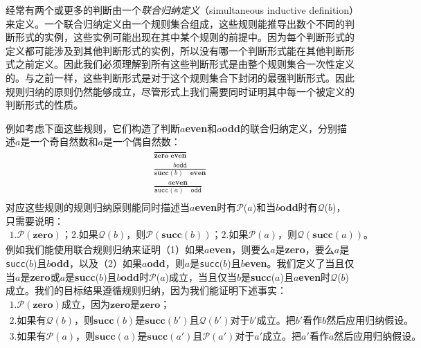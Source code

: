 经常有两个或更多的判断由一个\textit{联合归纳定义}（simultaneous inductive definition）来定义。一个联合归纳定义由一个规则集合组成，这些规则能推导出数个不同的判断形式的实例，这些实例可能出现在其中某个规则的前提中。因为每个判断形式的定义都可能涉及到其他判断形式的实例，所以没有哪一个判断形式能在其他判断形式之前定义。因此我们必须理解到所有这些判断形式是由整个规则集合一次性定义的。与之前一样，这些判断形式是对于这个规则集合下封闭的最强判断形式。因此规则归纳的原则仍然能够成立，尽管形式上我们需要同时证明其中每一个被定义的判断形式的性质。

例如考虑下面这些规则，它们构造了判断$a$\textbf{even}和$a$\textbf{odd}的联合归纳定义，分别描述$a$是一个奇自然数和$a$是一个偶自然数：
\begin{align*}
\frac{}{\textbf{zero even}} \\
\frac{b\texttt{odd}}{\textbf{succ}(b)\quad\textbf{even}} \\
\frac{a\textbf{even}}{\texttt{succ}(a)\quad\texttt{odd}} \\
\end{align*}
对应这些规则的规则归纳原则能同时描述当$a$\textbf{even}时有$\mathcal{P}$($a$)和当$b$\textbf{odd}时有$\mathcal{Q}$($b$)，只需要说明：
\begin{align*}
1.\mathcal{P}(\textbf{zero})；
2.如果\mathcal{Q}(b)，则\mathcal{P}(\textbf{succ}(b))；
2.如果\mathcal{P}(a)，则\mathcal{Q}(\textbf{succ}(a))。
\end{align*}
例如我们能使用联合规则归纳来证明（1）如果$a$\textbf{even}，则要么$a$是\textbf{zero}，要么$a$是\texttt{succ}($b$)且$b$\textbf{odd}，以及（2）如果$a$\textbf{odd}，则$a$是\texttt{succ}($b$)且$b$\textbf{even}。我们定义了当且仅当$a$是\textbf{zero}或$a$是\textbf{succ}($b$)且$b$\textbf{odd}时$\mathcal{P}$($a$)成立，当且仅当$b$是\textbf{succ}($a$)且$a$\textbf{even}时$\mathcal{Q}$($b$)成立。我们的目标结果遵循规则归纳，因为我们能证明下述事实：
\begin{align*}
1.\mathcal{P}(\textbf{zero})成立，因为\textbf{zero}是\textbf{zero}；\\
2.如果有\mathcal{Q}(b)，则\textbf{succ}(b)是\textbf{succ}(b')且\mathcal{Q}(b')对于b'成立。把b'看作b然后应用归纳假设。 \\
3.如果有\mathcal{P}(a)，则\textbf{succ}(a)是\textbf{succ}(a')且\mathcal{P}(a')对于a'成立。把a'看作a然后应用归纳假设。
\end{align*}
